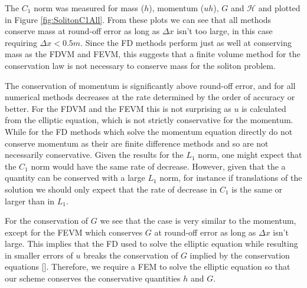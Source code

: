 %
The $C_1$ norm was measured for mass ($h$), momentum ($uh$), $G$ and $\mathcal{H}$ and plotted in Figure \ref{fig:SolitonC1All}. From these plots we can see that all methods conserve mass at round-off error as long as $\Delta x$ isn't too large, in this case requiring $\Delta x < 0.5m$. Since the FD methods perform just as well at conserving mass as the FDVM and FEVM, this suggests that a finite volume method for the conservation law is not necessary to conserve mass for the soliton problem.

The conservation of momentum is significantly above round-off error, and for all numerical methods decreases at the rate determined by the order of accuracy or better. For the FDVM and the FEVM this is not surprising as $u$ is calculated from the elliptic equation, which is not strictly conservative for the momentum. While for the FD methods which solve the momentum equation directly do not conserve momentum as their are finite difference methods and so are not necessarily conservative. Given the results for the $L_1$ norm, one might expect that the $C_1$ norm would have the same rate of decrease. However, given that the a quantity can be conserved with a large $L_1$ norm, for instance if translations of the solution we should only expect that the rate of decrease in $C_1$ is the same or larger than in $L_1$. 

For the conservation of $G$ we see that the case is very similar to the momentum, except for the FEVM which conserves $G$ at round-off error as long as $\Delta x$ isn't large. This implies that the FD used to solve the elliptic equation while resulting in smaller errors of $u$ breaks the conservation of $G$ implied by the conservation equations []. Therefore, we require a FEM to solve the elliptic equation so that our scheme conserves the conservative quantities $h$ and $G$.

